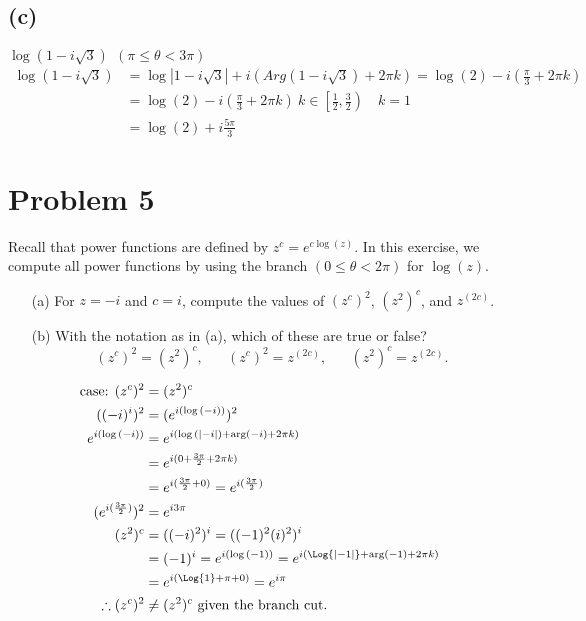 \documentclass{article}
\begin{document}
\subsection*{(c)}
$ \log(1 - i \sqrt 3) \ \ (\pi \leq \theta < 3 \pi)$
\begin{align*}
  \log{(1-i\sqrt{3})} &=  \log{|1-i\sqrt{3}|} + i(Arg(1-i\sqrt{3}) + 2\pi k)= \log{(2)} - i\left(\frac{\pi}{3} +  2\pi k\right)\\
  &= \log{(2)} - i\left(\frac{\pi}{3} +  2\pi k\right) \ k\in \left[\frac{1}{2},\frac{3}{2}\right) \quad k = 1\\
  &= \log{(2)} +i\frac{5\pi}{3} 
\end{align*}
\newpage
\section*{Problem 5}
Recall that power functions are defined by $z^c = e^{c \log(z)}$. In this exercise, we compute all power functions by using the branch $(0 \leq \theta < 2 \pi)$ for $\log(z)$.
\begin{enumerate}
\item [(a)] For $z = -i$ and $c = i$, compute the values of $(z^c)^2$, $(z^2)^c$, and $z^{(2c)}$.
\item [(b)] With the notation as in (a), which of these are true or false?
  $$ (z^c)^2 = (z^2)^c, \hspace{20pt} (z^c)^2 = z^{(2c)}, \hspace{20pt} (z^2)^c = z^{(2c)}.$$
\end{enumerate}
\begin{align*}
  \text{case: } (z^c)^2 &= (z^2)^c \\
  ((-i)^i)^2 &= (e^{i(\log{(-i)})})^2\\
  e^{i(\log{(-i)})} &= e^{i(\log{(|-i|) + \text{arg}(-i)+2\pi k})}\\
          &= e^{i(0 + \frac{3\pi}{2}+2\pi k)}\\
          &= e^{i(\frac{3\pi}{2}+0)} = e^{i(\frac{3\pi}{2})}\\
  (e^{i(\frac{3\pi}{2})})^2 &= e^{i3\pi}\\
  (z^2)^c &= ((-i)^2)^i = ((-1)^2(i)^2)^i \\
          &= (-1)^i = e^{i(\log{(-1)})}= e^{i(\Log{|-1|} + \text{arg}(-1) + 2\pi k)}\\
          &= e^{i(\Log{1} + \pi + 0)} = e^{i\pi} \\
  \therefore (z^c)^2 &\neq (z^2)^c \text{ given the branch cut.}
\end{align*}
\end{document}
